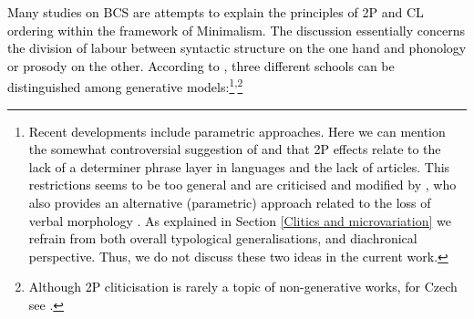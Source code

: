 \textcolor{black}{Many studies on BCS are attempts to explain the principles of 2P and CL ordering within the framework of Minimalism. The discussion essentially concerns the division of labour between syntactic structure on the one hand and phonology or prosody on the other. According to \citet{Boskovic00}, three different schools can be distinguished among generative models:\footnote{\textcolor{black}{Recent developments include parametric approaches. Here we can mention the somewhat controversial suggestion of \citet{Runic14} and \citet{Boskovic16} that 2P effects relate to the lack of a determiner phrase layer in languages and the lack of articles. This restrictions seems to be too general and are criticised and modified by \citet{Migdalski21}, who also provides an alternative (parametric) approach related to the loss of verbal morphology \citep{JungMigdalski15, Migdalski16, Migdalski20}. As explained in Section \ref{Clitics and microvariation} we refrain from both overall typological generalisations, and diachronical perspective. Thus, we do not discuss these two ideas in the current work.}}\textsuperscript{,}\footnote{\textcolor{black}{Although 2P cliticisation is rarely a topic of non-generative works, for Czech see \citet{Fried94}}.}}
